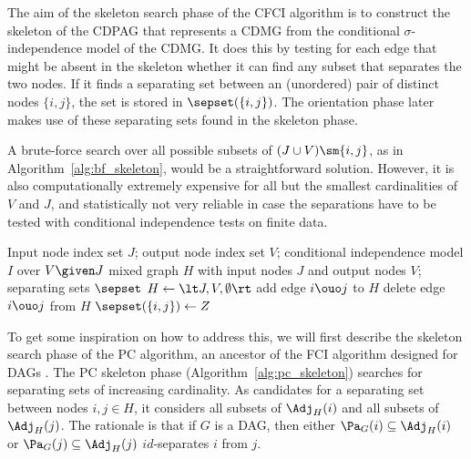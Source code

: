 The aim of the skeleton search phase of the CFCI algorithm is to construct the skeleton of the CDPAG that represents a CDMG from the conditional $\sigma$-independence model of the CDMG.
It does this by testing for each edge that might be absent in the skeleton whether it can find any subset that separates the two nodes.
If it finds a separating set between an (unordered) pair of distinct nodes $\{i, j\}$, the set is stored in $\sepset(\{i,j\})$.
The orientation phase later makes use of these separating sets found in the skeleton phase.

A brute-force search over all possible subsets of $(J \cup V)\sm \{i,j\}$, as in Algorithm~\ref{alg:bf_skeleton}, would be a straightforward solution.
However, it is also computationally extremely expensive for all but the smallest cardinalities of $V$ and $J$, and statistically not very reliable in case the separations have to be tested with conditional independence tests on finite data.
\begin{algorithm}
  \begin{algorithmic}[1]
    \Input Input node index set $J$; output node index set $V$; conditional independence model $I$ over $V \given J$
    \Output mixed graph $H$ with input nodes $J$ and output nodes $V$; separating sets $\sepset$
    \State $H \leftarrow \lt J, V, \emptyset \rt$
      \State add edge $i \ouo j$ to $H$
        \State delete edge $i \ouo j$ from $H$
        \State $\sepset(\{i,j\}) \leftarrow Z$
        \Break
      \EndIf
      \EndFor
    \EndFor
  \end{algorithmic}
  \caption{Brute-force skeleton algorithm $\mathtt{BFskeleton}(J,V,I)$.\label{alg:bf_skeleton}}
\end{algorithm}

To get some inspiration on how to address this, we will first describe the skeleton search phase of the PC algorithm, an ancestor of the FCI algorithm designed for DAGs \cite{SGS2000}.
The PC skeleton phase (Algorithm~\ref{alg:pc_skeleton}) searches for separating sets of increasing cardinality. 
As candidates for a separating set between nodes $i,j \in H$, it considers all subsets of $\Adj_H(i)$ and all subsets of $\Adj_H(j)$.
The rationale is that if $G$ is a DAG, then either $\Pa_G(i) \subseteq \Adj_H(i)$ or $\Pa_G(j) \subseteq \Adj_H(j)$ $id$-separates $i$ from $j$.

